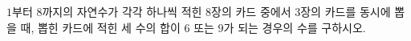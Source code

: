 $1$부터 $8$까지의 자연수가 각각 하나씩 적힌 $8$장의 카드 중에서 $3$장의 카드를 동시에 뽑을 때, 뽑힌 카드에 적힌 세 수의 합이 $6$ 또는 $9$가 되는 경우의 수를 구하시오.
